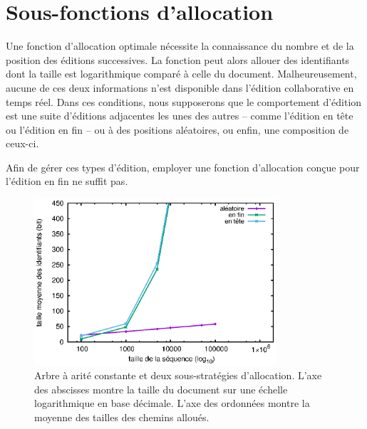

\section{Sous-fonctions d'allocation}
\label{repl:sec:suballocation}

Une fonction d'allocation optimale nécessite la connaissance du nombre et de la
position des éditions successives. La fonction peut alors allouer des
identifiants dont la taille est logarithmique comparé à celle du
document. Malheureusement, aucune de ces deux informations n'est disponible dans
l'édition collaborative en temps réel. Dans ces conditions, nous supposerons que
le comportement d'édition est une suite d'éditions adjacentes les unes des
autres -- comme l'édition en tête ou l'édition en fin -- ou à des positions
aléatoires, ou enfin, une composition de ceux-ci.

Afin de gérer ces types d'édition, employer une fonction d'allocation conçue
pour l'édition en fin ne suffit pas. 

\begin{figure}
  \centering
  \includegraphics[width=0.8\textwidth]{img/lseq/robin.eps}
  \caption{\label{repl:img:suballocation} Arbre à arité constante et deux
    sous-stratégies d'allocation. L'axe des abscisses montre la taille du
    document sur une échelle logarithmique en base décimale. L'axe des ordonnées
    montre la moyenne des tailles des chemins alloués.}
\end{figure}

